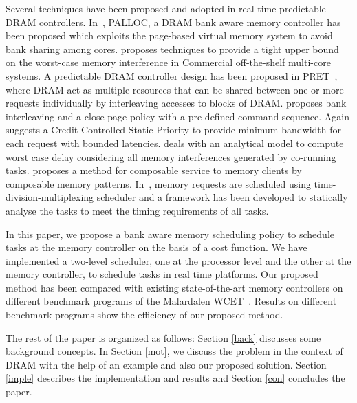 Several techniques have been proposed and adopted in real time predictable DRAM controllers.
In~\cite{yun2014palloc}, PALLOC, a DRAM bank aware memory controller has been proposed which exploits the page-based virtual 
memory system to avoid bank sharing among cores.
\cite{kim2014bounding} proposes techniques to provide a tight upper bound on the 
worst-case memory interference in Commercial off-the-shelf multi-core systems. 
A predictable DRAM controller design has been proposed in 
PRET~\cite{reineke2011pret}, where DRAM act as multiple resources that can be shared between one or more requests 
individually by interleaving accesses to blocks of DRAM. \cite{Akesson11-DATE} proposes bank interleaving and a close page 
policy with a pre-defined command sequence. Again \cite{akesson2008real} suggests a Credit-Controlled Static-Priority 
to provide minimum bandwidth for each request with bounded latencies. \cite{paolieri2013timing} deals with an analytical 
model to compute worst case delay considering all memory interferences generated by co-running tasks.
\cite{Goossens13CODES} proposes a method for composable service to memory clients by composable memory 
patterns. In~\cite{hassan2017predictable}, memory requests are scheduled using time-division-multiplexing scheduler and a 
framework has been developed to statically analyse the tasks to meet the timing requirements of all tasks.

In this paper, we propose a bank aware memory scheduling policy to schedule tasks at the memory 
controller on the basis of a cost function. We have implemented a
two-level scheduler, one at the processor level and the other at the memory controller, to schedule tasks in real time 
platforms. Our proposed method has been compared with existing state-of-the-art memory controllers on different 
benchmark programs of the Malardalen WCET~\cite{gustafsson2010malardalen}. Results on different benchmark 
programs show the efficiency of our proposed method. 

The rest of the paper is organized as follows: Section \ref{back} discusses some background concepts. 
In Section \ref{mot}, we discuss the problem in the context of DRAM with the help of an example and also our proposed 
solution. Section \ref{imple} describes the implementation and results and Section \ref{con} concludes the paper.


